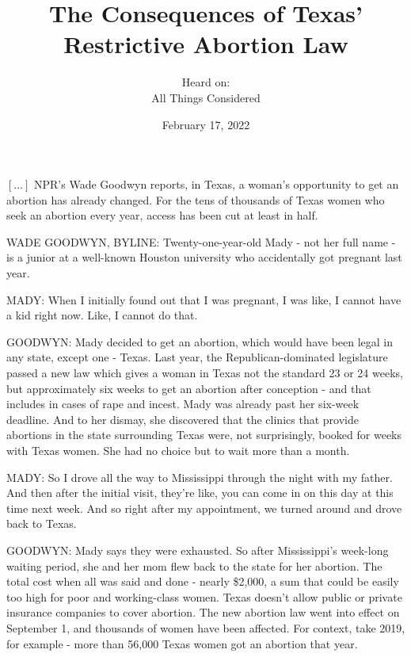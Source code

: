 \documentclass[10pt,a4paper]{article}
\begin{document}
\title{The Consequences of Texas' Restrictive Abortion Law}
\date{February 17, 2022}
\author{{\normalsize Heard on:}\\All Things Considered}
\maketitle
    
\thispagestyle{plain}
\setcounter{page}{2}
\linenumbers
$\left[\ldots\right]$ NPR's Wade Goodwyn reports, in Texas, a woman's opportunity to get an abortion has already changed. For the tens of thousands of Texas women who seek an abortion every year, access has been cut at least in half.

WADE GOODWYN, BYLINE: Twenty-one-year-old Mady - not her full name - is a junior at a well-known Houston university who accidentally got pregnant last year.

MADY: When I initially found out that I was pregnant, I was like, I cannot have a kid right now. Like, I cannot do that.

GOODWYN: Mady decided to get an abortion, which would have been legal in any state, except one - Texas. Last year, the Republican-dominated legislature passed a new law which gives a woman in Texas not the standard 23 or 24 weeks, but approximately six weeks to get an abortion after conception - and that includes in cases of rape and incest.
Mady was already past her six-week deadline. And to her dismay, she discovered that the clinics that provide abortions in the state surrounding Texas were, not surprisingly, booked for weeks with Texas women. She had no choice but to wait more than a month.

MADY: So I drove all the way to Mississippi through the night with my father. And then after the initial visit, they're like, you can come in on this day at this time next week. And so right after my appointment, we turned around and drove back to Texas.

GOODWYN: Mady says they were exhausted. So after Mississippi's week-long waiting period, she and her mom flew back to the state for her abortion. The total cost when all was said and done - nearly \$2,000, a sum that could be easily too high for poor and working-class women. Texas doesn't allow public or private insurance companies to cover abortion.
The new abortion law went into effect on September 1, and thousands of women have been affected. For context, take 2019, for example - more than 56,000 Texas women got an abortion that year.
\end{document}
